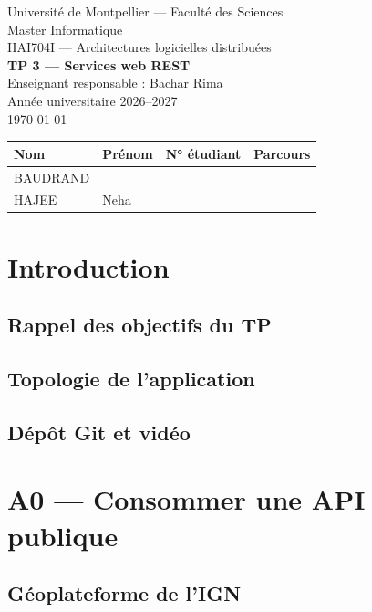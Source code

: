 \documentclass[11pt,a4paper]{report}
\begin{document}
\begin{titlepage}
  \centering
  Université de Montpellier --- Faculté des Sciences\\
  Master Informatique\\[2cm]

  {\Large HAI704I --- Architectures logicielles distribuées}\\[1cm]
  {\huge\bfseries TP 3 --- Services web REST}\\[2cm]

  Enseignant responsable : Bachar Rima\\
  Année universitaire 2026--2027\\
  \today\\[2cm]

  \begin{tabular}{llll}
    \toprule
    Nom & Prénom & N° étudiant & Parcours \\
    \midrule
    BAUDRAND & & & \\
    HAJEE & Neha & & \\
    \bottomrule
  \end{tabular}
\end{titlepage}

\tableofcontents

\chapter{Introduction}
\section{Rappel des objectifs du TP}
\section{Topologie de l'application}
\section{Dépôt Git et vidéo}

\chapter{A0 --- Consommer une API publique}
\section{Géoplateforme de l'IGN}
\end{document}
